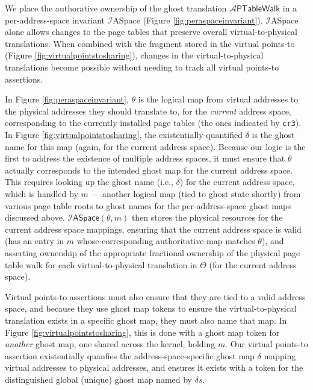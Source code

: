 We place the authorative ownership of the ghost translation $\mathcal{A}\textsf{PTableWalk}$ in a per-address-space invariant
$\mathcal{I}$\textsf{ASpace} (Figure \ref{fig:peraspaceinvariant}). 
$\mathcal{I}$\textsf{ASpace} alone allows changes to the page tables 
that preserve overall virtual-to-physical translations.
When combined with the
fragment stored in the virtual points-to (Figure \ref{fig:virtualpointstosharing}),
changes in the virtual-to-physical translations become possible without needing to track all virtual points-to assertions.

In Figure \ref{fig:peraspaceinvariant},
$\theta$ is the logical map from virtual addresses to the physical addresses they should translate to, 
for the \emph{current} address space, corresponding to the currently installed page tables (the ones
indicated by \lstinline|cr3|). In Figure \ref{fig:virtualpointstosharing}, the existentially-quantified $\delta$
is the ghost name for this map (again, for the current address space).
Because our logic is the first to address the existence of multiple address spaces,
it must ensure that $\theta$ actually corresponds to the intended ghost map for the current address space.
This requires looking up the ghost name (i.e., $\delta$) for the current address space,
which is handled by $m$ --- another logical map (tied to ghost state shortly)
from various page table roots to ghost names for the per-address-space ghost maps discussed above.
$\mathcal{I}\textsf{ASpace}(\theta,m)$ then stores the physical resources for the current address space mappings,
ensuring that the current address space is valid (has an entry in $m$ whose corresponding
authoritative map matches $\theta$), and asserting ownership of the appropriate fractional ownership
of the physical page table walk for each virtual-to-physical translation in $\Theta$ (for the current address space).

Virtual points-to assertions must also ensure that they are tied to a valid address space, and because they
use ghost map tokens to ensure the virtual-to-physical translation exists in a specific ghost map, they must also
name that map. In Figure \ref{fig:virtualpointstosharing}, this is done with a ghost map token for \emph{another} ghost map,
one shared across the kernel, holding $m$. Our virtual points-to assertion existentially quanfies the address-space-specific
ghost map $\delta$ mapping virtual addresses to physical addresses, and ensures it exists with a token for the distinguished
global (unique) ghost map named by $\delta{s}$.
  
